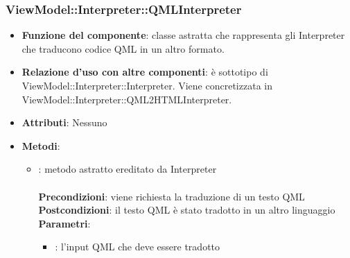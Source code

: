 \subsubsection{ViewModel::Interpreter::QMLInterpreter}
\begin{itemize}
\item\textbf{Funzione del componente}: classe astratta che rappresenta gli Interpreter che traducono codice QML in un altro formato.
	\item\textbf{Relazione d'uso con altre componenti}: è sottotipo di ViewModel::Interpreter::Interpreter. Viene concretizzata in ViewModel::Interpreter::QML2HTMLInterpreter.\\ 
\item\textbf{Attributi}: Nessuno
\item\textbf{Metodi}:
	\begin{itemize}
		\item{}: metodo astratto ereditato da Interpreter\\\\
		\textbf{Precondizioni}: viene richiesta la traduzione di un testo QML\\
		\textbf{Postcondizioni}: il testo QML è stato tradotto in un altro linguaggio\\
		\textbf{Parametri}:
			\begin{itemize}
				\item{}: l'input QML che deve essere tradotto \\
			\end{itemize}
	\end{itemize}
\end{itemize}

